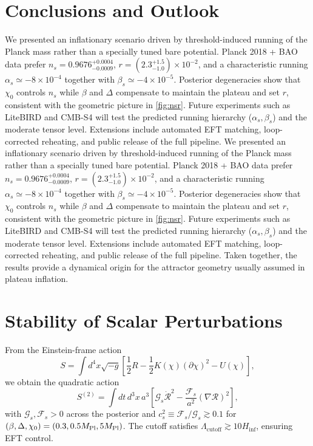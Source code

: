 \documentclass[11pt,a4paper]{article}
\begin{document}
\section{Conclusions and Outlook}
We presented an inflationary scenario driven by threshold-induced running of the Planck mass rather than a specially tuned bare potential. Planck 2018 + BAO data prefer $n_{s}=0.9676^{+0.0004}_{-0.0009}$, $r=(2.3^{+1.5}_{-1.0})\times10^{-2}$, and a characteristic running $\alpha_{s}\simeq-8\times10^{-4}$ together with $\beta_{s}\simeq-4\times10^{-5}$. Posterior degeneracies show that $\chi_{0}$ controls $n_{s}$ while $\beta$ and $\Delta$ compensate to maintain the plateau and set $r$, consistent with the geometric picture in \cref{fig:nsr}. Future experiments such as LiteBIRD and CMB-S4 will test the predicted running hierarchy ($\alpha_{s},\beta_{s}$) and the moderate tensor level. Extensions include automated EFT matching, loop-corrected reheating, and public release of the full pipeline.
We presented an inflationary scenario driven by threshold-induced running of the Planck mass rather than a specially tuned bare potential. Planck 2018 + BAO data prefer $n_{s}=0.9676^{+0.0004}_{-0.0009}$, $r=(2.3^{+1.5}_{-1.0})\times10^{-2}$, and a characteristic running $\alpha_{s}\simeq-8\times10^{-4}$ together with $\beta_{s}\simeq-4\times10^{-5}$. Posterior degeneracies show that $\chi_{0}$ controls $n_{s}$ while $\beta$ and $\Delta$ compensate to maintain the plateau and set $r$, consistent with the geometric picture in \cref{fig:nsr}. Future experiments such as LiteBIRD and CMB-S4 will test the predicted running hierarchy ($\alpha_{s},\beta_{s}$) and the moderate tensor level. Extensions include automated EFT matching, loop-corrected reheating, and public release of the full pipeline. Taken together, the results provide a dynamical origin for the attractor geometry usually assumed in plateau inflation.

\section{Stability of Scalar Perturbations}
\label{sec:stability}
From the Einstein-frame action
\begin{equation}
S=\int d^{4}x\sqrt{-g}\left[\frac{1}{2}R-\frac{1}{2}K(\chi)(\partial\chi)^{2}-U(\chi)\right],
\end{equation}
we obtain the quadratic action
\begin{equation}
S^{(2)}=\int dt\,d^{3}x\,a^{3}\left[\mathcal{G}_{s}\dot{\mathcal{R}}^{2}-\frac{\mathcal{F}_{s}}{a^{2}}(\nabla\mathcal{R})^{2}\right],
\end{equation}
with $\mathcal{G}_{s},\mathcal{F}_{s}>0$ across the posterior and $c_{s}^{2}\equiv\mathcal{F}_{s}/\mathcal{G}_{s}\gtrsim0.1$ for $(\beta,\Delta,\chi_{0})=(0.3,0.5M_{\rm Pl},5M_{\rm Pl})$. The cutoff satisfies $\Lambda_{\text{cutoff}}\gtrsim10H_{\text{inf}}$, ensuring EFT control.
\end{document}
